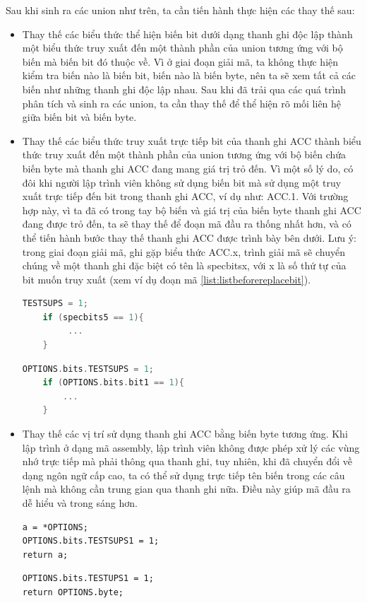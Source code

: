 Sau khi sinh ra các union như trên, ta cần tiến hành thực hiện các thay thế sau:
\begin{itemize}
	\item Thay thế các biểu thức thể hiện biến bit dưới dạng thanh ghi độc lập thành một biểu thức truy xuất đến một thành phần của union tương ứng với bộ biến mà biến bit đó thuộc về. Vì ở giai đoạn giải mã, ta không thực hiện kiểm tra biến nào là biến bit, biến nào là biến byte, nên ta sẽ xem tất cả các biến như những thanh ghi độc lập nhau. Sau khi đã trải qua các quá trình phân tích và sinh ra các union, ta cần thay thế để thể hiện rõ mối liên hệ giữa biến bit và biến byte.
	
	\item Thay thế các biểu thức truy xuất trực tiếp bit của thanh ghi ACC thành biểu thức truy xuất đến một thành phần của union tương ứng với bộ biến chứa biến byte mà thanh ghi ACC đang mang giá trị trỏ đến. Vì một số lý do, có đôi khi người lập trình viên không sử dụng biến bit mà sử dụng một truy xuất trực tiếp đến bit trong thanh ghi ACC, ví dụ như: ACC.1. Với trường hợp này, vì ta đã có trong tay bộ biến và giá trị của biến byte thanh ghi ACC đang được trỏ đến, ta sẽ thay thế để đoạn mã đầu ra thống nhất hơn, và có thể tiến hành bước thay thế thanh ghi ACC được trình bày bên dưới. Lưu ý: trong giai đoạn giải mã, ghi gặp biểu thức ACC.x, trình giải mã sẽ chuyển chúng về một thanh ghi đặc biệt có tên là specbitsx, với x là số thứ tự của bit muốn truy xuất (xem ví dụ đoạn mã \ref{list:listbeforereplacebit}).
	\begin{lstlisting}[caption={Mã đầu ra trước khi thực hiện bước thay thế biến bit},label={list:listbeforereplacebit}, language = c]
	TESTSUPS = 1;
	if (specbits5 == 1){
		 ...
	}
	\end{lstlisting}
	
	\begin{lstlisting}[caption={Mã đầu ra sau khi thực hiện bước thay thế biến bit},label={list:listafterreplacebit}, language = c]
	OPTIONS.bits.TESTSUPS = 1;
	if (OPTIONS.bits.bit1 == 1){
		...
	}
	\end{lstlisting}
\item Thay thế các vị trí sử dụng thanh ghi ACC bằng biến byte tương ứng. Khi lập trình ở dạng mã assembly, lập trình viên không được phép xử lý các vùng nhớ trực tiếp mà phải thông qua thanh ghi, tuy nhiên, khi đã chuyển đổi về dạng ngôn ngữ cấp cao, ta có thể sử dụng trực tiếp tên biến trong các câu lệnh mà không cần trung gian qua thanh ghi nữa. Điều này giúp mã đầu ra dễ hiểu và trong sáng hơn.

\begin{lstlisting}[caption={Mã đầu ra trước khi thực hiện bước thay thế thanh ghi ACC},label={list:listbeforereplace}]
a = *OPTIONS;
OPTIONS.bits.TESTSUPS1 = 1;
return a;
\end{lstlisting}
\begin{lstlisting}[caption={Mã đầu ra sau khi thực hiện bước thay thế thanh ghi ACC},label={list:listafterreplace}]
OPTIONS.bits.TESTUPS1 = 1;
return OPTIONS.byte;
\end{lstlisting}
\end{itemize}



